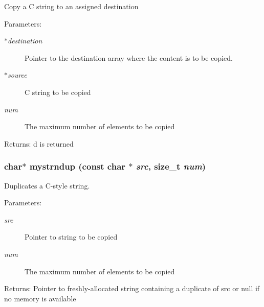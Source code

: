 Copy a C string to an assigned destination \begin{Desc}
\item[Parameters:]
\begin{description}
\item[{\em $\ast$destination}]Pointer to the destination array where the content is to be copied. \item[{\em $\ast$source}]C string to be copied \item[{\em num}]The maximum number of elements to be copied \end{description}
\end{Desc}
\begin{Desc}
\item[Returns:]d is returned \end{Desc}
\subsubsection{\setlength{\rightskip}{0pt plus 5cm}char$\ast$ mystrndup (const char $\ast$ {\em src}, size\_\-t {\em num})}\label{mystring_8h_0a1018503560c08ec35bea7a562cb31c}


Duplicates a C-style string. \begin{Desc}
\item[Parameters:]
\begin{description}
\item[{\em src}]Pointer to string to be copied \item[{\em num}]The maximum number of elements to be copied \end{description}
\end{Desc}
\begin{Desc}
\item[Returns:]Pointer to freshly-allocated string containing a duplicate of src or null if no memory is available \end{Desc}
